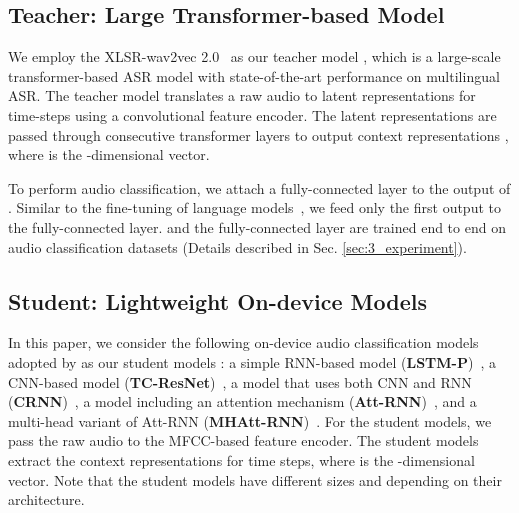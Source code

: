 \documentclass{article}
\begin{document}
\subsection{Teacher: Large Transformer-based Model}\label{subsec:2_1_teacher_model}
We employ the XLSR-wav2vec 2.0~\cite{conneau2020unsupervised} as our teacher model , which is a large-scale transformer-based ASR model with state-of-the-art performance on multilingual ASR.
The teacher model translates a raw audio  to latent representations for  time-steps using a convolutional feature encoder.
The latent representations are passed through  consecutive transformer layers to output context representations , where  is the -dimensional vector.

To perform audio classification, we attach a fully-connected layer to the output  of .
Similar to the fine-tuning of language models~\cite{devlin2019bert}, we feed only the first output  to the fully-connected layer.
 and the fully-connected layer are trained end to end on audio classification datasets (Details described in Sec. \ref{sec:3_experiment}).

\subsection{Student: Lightweight On-device Models}\label{subsec:2_2_student_model}
In this paper, we consider the following on-device audio classification models adopted by \cite{Rybakov_2020} as our student models : a simple RNN-based model (\textbf{LSTM-P})~\cite{DBLP:journals/jmlr/GersSS02}, a CNN-based model (\textbf{TC-ResNet})~\cite{Choi2019tcresnet}, a model that uses both CNN and RNN (\textbf{CRNN})~\cite{DBLP:conf/interspeech/ArikKCHGFPC17}, a model including an attention mechanism (\textbf{Att-RNN})~\cite{Andrade2018aneural}, and a multi-head variant of Att-RNN (\textbf{MHAtt-RNN})~\cite{Rybakov_2020}.
For the student models, we pass the raw audio to the MFCC-based feature encoder.
The student models extract the context representations  for  time steps, where  is the -dimensional vector.
Note that the student models have different sizes  and  depending on their architecture.
\end{document}
